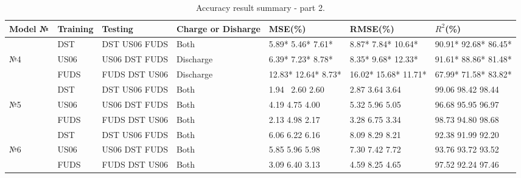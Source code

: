 \begin{center}
    \begin{table}[htbp]
\begin{tabular}{ p{1.5cm} p{1.5cm} p{1.5cm} p{3.2cm} p{1.5cm} p{1.5cm} p{1.8cm} }
    \hline
    Model № & Training  & Testing & Charge or Disharge & MSE(\%) & RMSE(\%) & $R^{2}$(\%) \\
    \hline
     & DST  & DST US06 FUDS & Both & 5.89* 5.46* 7.61* & 8.87* 7.84* 10.64* & 90.91* 92.68* 86.45* \\
    №4%
     & US06 & US06 DST FUDS & Discharge & 6.39* 7.23* 8.78* & 8.35* 9.68* 12.33* & 91.61* 88.86* 81.48* \\
     & FUDS & FUDS DST US06 & Discharge & 12.83* 12.64* 8.73* & 16.02* 15.68* 11.71* & 67.99* 71.58* 83.82* \\
    \hline
     & DST  & DST US06 FUDS & Both & 1.94 \ 2.60 2.60 & 2.87 3.64 3.64 & 99.06 98.42 98.44 \\
    №5%
     & US06 & US06 DST FUDS & Both & 4.19 4.75 4.00 & 5.32 5.96 5.05  & 96.68 95.95 96.97  \\
     & FUDS & FUDS DST US06 & Both & 2.13 4.98 2.17  & 3.28 6.75 3.34 & 98.73 94.80 98.68  \\
    \hline%
     & DST  & DST US06 FUDS & Both & 6.06 6.22 6.16 & 8.09 8.29 8.21 & 92.38 91.99 92.20 \\
    №6%
     & US06 & US06 DST FUDS & Both & 5.85 5.96 5.98 & 7.30 7.42 7.72 & 93.76 93.72 93.52 \\
     & FUDS & FUDS DST US06 & Both & 3.09 6.40 3.13 & 4.59 8.25 4.65 & 97.52 92.24 97.46 \\
    \hline
\end{tabular} \\
\caption{Accuracy result summary - part 2.}
\label{tab:acc-results2}
    \end{table}
\end{center}
